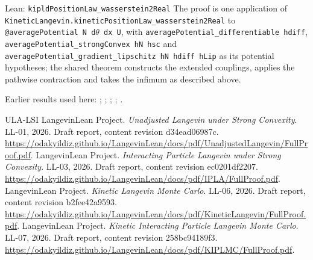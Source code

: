 \documentclass[11pt,a4paper]{article}
\begin{document}
\begin{leanbox}{Lean: \texttt{kipldPositionLaw\_\allowbreak{}wasserstein2Real}}
The proof is one application of \texttt{Kinetic\allowbreak{}Langevin.\allowbreak{}kinetic\allowbreak{}Position\allowbreak{}Law\_\allowbreak{}wasserstein2\allowbreak{}Real} to \texttt{@average\allowbreak{}Potential N d\ensuremath{\theta} dx U}, with \texttt{average\allowbreak{}Potential\_\allowbreak{}differentiable hdiff}, \texttt{average\allowbreak{}Potential\_\allowbreak{}strong\allowbreak{}Convex h\allowbreak{}N hsc} and \texttt{average\allowbreak{}Potential\_\allowbreak{}gradient\_\allowbreak{}lipschitz h\allowbreak{}N hdiff h\allowbreak{}Lip} as its potential hypotheses; the shared theorem constructs the extended couplings, applies the pathwise contraction and takes the infimum as described above.
\end{leanbox}


Earlier results used here: \cite[Section~3.17.3]{LangevinLean2026ULASC}; \cite[Section~3.17.4]{LangevinLean2026ULASC}; \cite[Section~3.1.1]{LangevinLean2026IPLA}; \cite[Section~3.2.2]{LangevinLean2026Kinetic}; \cite[Section~3.9.6]{LangevinLean2026Kinetic}.

\begin{thebibliography}{ULA-LSI}
LangevinLean Project. \emph{Unadjusted Langevin under Strong Convexity}. LL-01, 2026. Draft report, content revision d34ead06987c. \url{https://odakyildiz.github.io/LangevinLean/docs/pdf/UnadjustedLangevin/FullProof.pdf}.
LangevinLean Project. \emph{Interacting Particle Langevin under Strong Convexity}. LL-03, 2026. Draft report, content revision ec0201df2207. \url{https://odakyildiz.github.io/LangevinLean/docs/pdf/IPLA/FullProof.pdf}.
LangevinLean Project. \emph{Kinetic Langevin Monte Carlo}. LL-06, 2026. Draft report, content revision b2fee42a9593. \url{https://odakyildiz.github.io/LangevinLean/docs/pdf/KineticLangevin/FullProof.pdf}.
LangevinLean Project. \emph{Kinetic Interacting Particle Langevin Monte Carlo}. LL-07, 2026. Draft report, content revision 258bc94189f3. \url{https://odakyildiz.github.io/LangevinLean/docs/pdf/KIPLMC/FullProof.pdf}.
\end{thebibliography}
\end{document}

